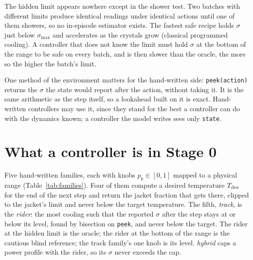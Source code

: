\documentclass[11pt,a4paper]{article}
\newcommand{\smax}{\sigma_{\max}}
\begin{document}
The hidden limit appears nowhere except in the shower test. Two batches with
different limits produce identical readings under identical actions until
one of them showers, so no in-episode estimator exists. The fastest safe
recipe holds $\sigma$ just below $\smax$ and accelerates as the crystals grow
(classical programmed cooling). A controller that does not know the limit
must hold $\sigma$ at the bottom of the range to be safe on every batch, and
is then slower than the oracle, the more so the higher the batch's limit.

One method of the environment matters for the hand-written side:
\texttt{peek(action)} returns the $\sigma$ the state would report after the
action, without taking it. It is the same arithmetic as the step itself, so
a lookahead built on it is exact. Hand-written controllers may use it, since
they stand for the best a controller can do with the dynamics known; a
controller the model writes sees only \texttt{state}.

\section{What a controller is in Stage 0}
\label{sec:families}

Five hand-written families, each with knobs $p_k\in[0,1]$ mapped to a
physical range (Table~\ref{tab:families}). Four of them compute a desired
temperature $T_{\rm des}$ for the end of the next step and return the jacket
fraction that gets there, clipped to the jacket's limit and never below the
target temperature. The fifth, \emph{track}, is the \emph{rider}: the most
cooling such that the reported $\sigma$ after the step stays at or below its
level, found by bisection on \texttt{peek}, and never below the target. The
rider at the hidden limit is the oracle; the rider at the bottom of the range
is the cautious blind reference; the track family's one knob is its level.
\emph{hybrid} caps a power profile with the rider, so its $\sigma$ never
exceeds the cap.
\end{document}
